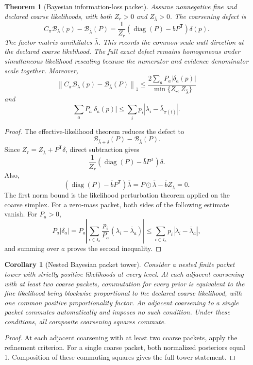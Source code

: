 \documentclass[11pt,letterpaper]{article}
\newtheorem{theorem}{Theorem}[section]
\theoremstyle{plain}
\theoremstyle{plain}
\theoremstyle{plain}
\newtheorem{corollary}[corollary]{Corollary}
\theoremstyle{definition}
\theoremstyle{definition}
\theoremstyle{definition}
\theoremstyle{definition}
\theoremstyle{definition}
\theoremstyle{remark}
\theoremstyle{remark}
\theoremstyle{remark}
\theoremstyle{remark}
\theoremstyle{remark}
\newcommand{\cB}{\mathcal B}
\newcommand{\diag}{\operatorname{diag}}
\theoremstyle{remark}
\let\KomorebiPrimitiveMathcal\mathcal
\renewcommand{\mathcal}[1]{{\KomorebiPrimitiveMathcal{#1}}}
\let\KomorebiPrimitivemathsf\mathsf
\renewcommand{\mathsf}[1]{{\KomorebiPrimitivemathsf{#1}}}
\begin{document}
\begin{theorem}[Bayesian information-loss packet]\label{core:record:023}
Assume nonnegative fine and declared coarse likelihoods, with both $Z_r>0$ and $Z_{\bar\lambda}>0$. The coarsening defect is
\[
\boxed{
C_\pi\cB_\lambda(p)
-
\cB_{\bar\lambda}(P)
=
\frac{1}{Z_r}
\left(\diag(P)-\bar bP^{\mathsf T}\right)
\delta(p).}
\]
The factor matrix annihilates $\bar\lambda$.  This records the common-scale null direction at the declared coarse likelihood. The full exact defect remains homogeneous under simultaneous likelihood rescaling because the numerator and evidence denominator scale together.  Moreover,
\[
\boxed{
\left\|C_\pi\cB_\lambda(p)-\cB_{\bar\lambda}(P)\right\|_1
\le
\frac{2\sum_aP_a|\delta_a(p)|}
{\min\{Z_r,Z_{\bar\lambda}\}}}
\]
and
\[
\sum_aP_a|\delta_a(p)|
\le
\sum_i p_i\left|\lambda_i-\bar\lambda_{\pi(i)}\right|.
\]
\end{theorem}

\begin{proof}
The effective-likelihood theorem reduces the defect to
\[
\cB_{\bar\lambda+\delta}(P)-\cB_{\bar\lambda}(P).
\]
Since $Z_r=Z_{\bar\lambda}+P^{\mathsf T}\delta$, direct subtraction gives
\[
\frac{1}{Z_r}
\left(\diag(P)-\bar bP^{\mathsf T}\right)\delta.
\]
Also,
\[
\left(\diag(P)-\bar bP^{\mathsf T}\right)\bar\lambda
=P\odot\bar\lambda-\bar bZ_{\bar\lambda}=0.
\]
The first norm bound is the likelihood perturbation theorem applied on the coarse simplex. For a zero-mass packet, both sides of the following estimate vanish. For $P_a>0$,
\[
P_a|\delta_a|
=
P_a\left|\sum_{i\in I_a}\frac{p_i}{P_a}
(\lambda_i-\bar\lambda_a)\right|
\le
\sum_{i\in I_a}p_i|\lambda_i-\bar\lambda_a|,
\]
and summing over $a$ proves the second inequality.
\end{proof}

\begin{corollary}[Nested Bayesian packet tower]\label{core:record:024}
Consider a nested finite packet tower with strictly positive likelihoods at every level. At each adjacent coarsening with at least two coarse packets, commutation for every prior is equivalent to the fine likelihood being blockwise proportional to the declared coarse likelihood, with one common positive proportionality factor. An adjacent coarsening to a single packet commutes automatically and imposes no such condition. Under these conditions, all composite coarsening squares commute.
\end{corollary}

\begin{proof}
At each adjacent coarsening with at least two coarse packets, apply the refinement criterion. For a single coarse packet, both normalized posteriors equal 1. Composition of these commuting squares gives the full tower statement.
\end{proof}
\end{document}
